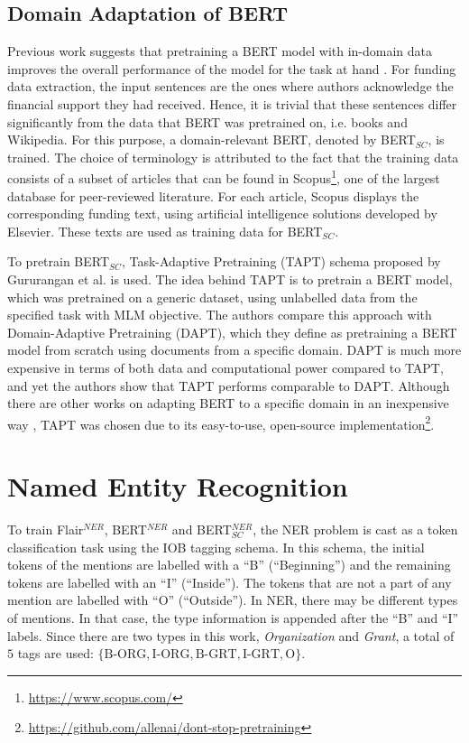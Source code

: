 \documentclass{report}
\theoremstyle{definition}
\theoremstyle{remark}
\begin{document}
\subsection{Domain Adaptation of BERT}
Previous work suggests that pretraining a BERT model with in-domain data improves the overall performance of the model for the task at hand \cite{DontStop,exBERT,quote3}. For funding data extraction, the input sentences are the ones where authors acknowledge the financial support they had received. Hence, it is trivial that these sentences differ significantly from the data that BERT was pretrained on, i.e. books and Wikipedia.  For this purpose, a domain-relevant BERT, denoted by BERT$_{SC}$, is trained. The choice of terminology is attributed to the fact that the training data consists of a subset of articles that can be found in Scopus\footnote{\url{https://www.scopus.com/}}, one of the largest database for peer-reviewed literature. For each article, Scopus displays the corresponding funding text, using artificial intelligence solutions developed by Elsevier. These texts are used as training data for BERT$_{SC}$.

To pretrain BERT$_{SC}$, Task-Adaptive Pretraining (TAPT) schema proposed by Gururangan et al. \cite{DontStop} is used. The idea behind TAPT is to pretrain a BERT model, which was pretrained on a generic dataset, using unlabelled data from the specified task with MLM objective. The authors compare this approach with Domain-Adaptive Pretraining (DAPT), which they define as pretraining a BERT model from scratch using documents from a specific domain. DAPT is much more expensive in terms of both data and computational power compared to TAPT, and yet the authors show that TAPT performs comparable to DAPT. Although there are other works on adapting BERT to a specific domain in an inexpensive way \cite{exBERT,word2vectoBERT}, TAPT was chosen due to its easy-to-use, open-source implementation\footnote{\url{https://github.com/allenai/dont-stop-pretraining}}.


\section{Named Entity Recognition}
\label{sec:NERMEThod}

To train  Flair$^{NER}$, BERT$^{NER}$ and BERT$^{NER}_{SC}$, the NER problem is cast as a token classification task using the IOB tagging schema. In this schema, the initial tokens of the mentions are labelled with a ``B'' (``Beginning'') and the remaining tokens are labelled with an ``I'' (``Inside''). The tokens that are not a part of any mention are labelled with ``O'' (``Outside''). In NER, there may be different types of mentions. In that case, the type information is appended after the ``B'' and ``I'' labels. Since there are two types in this work, \textit{Organization} and \textit{Grant}, a total of $5$ tags are used: $\{ \text{B-ORG}, \text{I-ORG}, \text{B-GRT}, \text{I-GRT}, \text{O} \}$.
\end{document}
